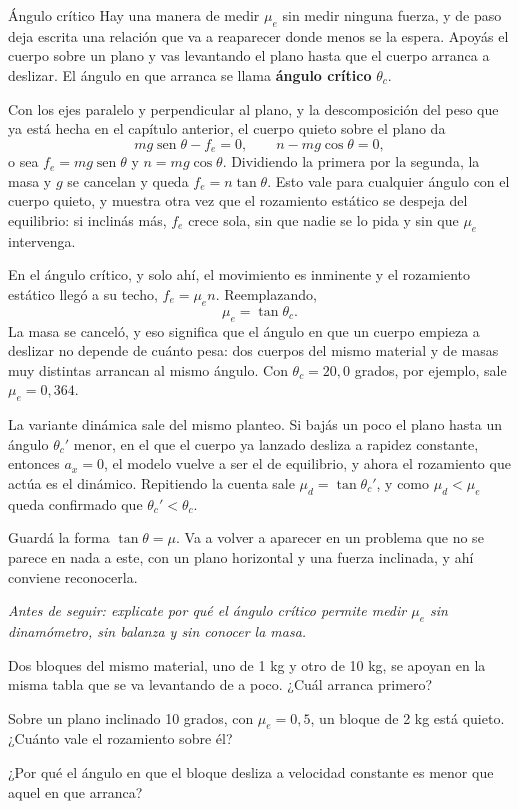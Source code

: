 \documentclass[11pt,openany]{book}
\newcommand{\sen}{\operatorname{sen}}
\begin{document}
\begin{bloque}{Ángulo crítico}
Hay una manera de medir $\mu_e$ sin medir ninguna fuerza, y de paso deja escrita una relación que va a reaparecer donde menos se la espera. Apoyás el cuerpo sobre un plano y vas levantando el plano hasta que el cuerpo arranca a deslizar. El ángulo en que arranca se llama \textbf{ángulo crítico} $\theta_c$.

Con los ejes paralelo y perpendicular al plano, y la descomposición del peso que ya está hecha en el capítulo anterior, el cuerpo quieto sobre el plano da
\[
mg\sen\theta - f_e = 0 ,
\qquad
n - mg\cos\theta = 0 ,
\]
o sea $f_e = mg\sen\theta$ y $n = mg\cos\theta$. Dividiendo la primera por la segunda, la masa y $g$ se cancelan y queda $f_e = n\tan\theta$. Esto vale para cualquier ángulo con el cuerpo quieto, y muestra otra vez que el rozamiento estático se despeja del equilibrio: si inclinás más, $f_e$ crece sola, sin que nadie se lo pida y sin que $\mu_e$ intervenga.

En el ángulo crítico, y solo ahí, el movimiento es inminente y el rozamiento estático llegó a su techo, $f_e = \mu_e n$. Reemplazando,
\[
\mu_e = \tan\theta_c .
\]
La masa se canceló, y eso significa que el ángulo en que un cuerpo empieza a deslizar no depende de cuánto pesa: dos cuerpos del mismo material y de masas muy distintas arrancan al mismo ángulo. Con $\theta_c = 20{,}0$ grados, por ejemplo, sale $\mu_e = 0{,}364$.

La variante dinámica sale del mismo planteo. Si bajás un poco el plano hasta un ángulo $\theta_c'$ menor, en el que el cuerpo ya lanzado desliza a rapidez constante, entonces $a_x = 0$, el modelo vuelve a ser el de equilibrio, y ahora el rozamiento que actúa es el dinámico. Repitiendo la cuenta sale $\mu_d = \tan\theta_c'$, y como $\mu_d < \mu_e$ queda confirmado que $\theta_c' < \theta_c$.

Guardá la forma $\tan\theta = \mu$. Va a volver a aparecer en un problema que no se parece en nada a este, con un plano horizontal y una fuerza inclinada, y ahí conviene reconocerla.

\textit{Antes de seguir: explicate por qué el ángulo crítico permite medir $\mu_e$ sin dinamómetro, sin balanza y sin conocer la masa.}
\end{bloque}

\begin{chequeo}
\item Dos bloques del mismo material, uno de 1 kg y otro de 10 kg, se apoyan en la misma tabla que se va levantando de a poco. ¿Cuál arranca primero?
\item Sobre un plano inclinado 10 grados, con $\mu_e = 0{,}5$, un bloque de 2 kg está quieto. ¿Cuánto vale el rozamiento sobre él?
\item ¿Por qué el ángulo en que el bloque desliza a velocidad constante es menor que aquel en que arranca?
\end{chequeo}
\end{document}
